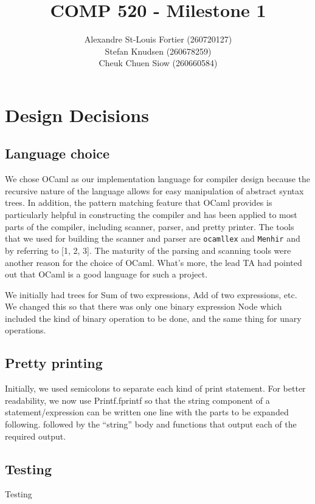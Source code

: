 \documentclass{article}
\begin{document}
\pagestyle{empty}

\title{COMP 520 - Milestone 1}
\author{
Alexandre St-Louis Fortier (260720127)\\
Stefan Knudsen (260678259)\\
Cheuk Chuen Siow (260660584)}
\maketitle

\section*{Design Decisions}
\subsection*{Language choice}
We chose OCaml as our implementation language for compiler design because the recursive nature of the language allows for easy manipulation of abstract syntax trees. In addition, the pattern matching feature that OCaml provides is particularly helpful in constructing the compiler and has been applied to most parts of the compiler, including scanner, parser, and pretty printer. The tools that we used for building the scanner and parser are \verb|ocamllex| and \verb|Menhir| and by referring to [1, 2, 3]. The maturity of the parsing and scanning tools were another reason for the choice of OCaml. What's more, the lead TA had pointed out that OCaml is a good language for such a project. 

We initially had trees for Sum of two expressions, Add of two expressions, etc. We changed this so that there was only one binary expression Node which included the kind of binary operation to be done, and the same thing for unary operations.

\subsection*{Pretty printing}
Initially, we used semicolons to separate each kind of print statement. For better readability, we now use Printf.fprintf so that the string component of a statement/expression can be written one line with the parts to be expanded following.
followed by the ``string'' body and functions that output each of the required output.

\subsection*{Testing}
Testing 
\end{document}
